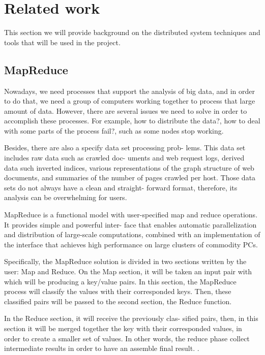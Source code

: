 
\label{sec:relatedWork}
\section{Related work}
This section we will provide background on the distributed system techniques and tools that will be used in the project.

\subsection{MapReduce}

Nowadays, we need processes that support the analysis of big data, and in order to do that, we need a group of computers working together to process that large amount of data. However, there are several issues we need to solve in order to accomplish these processes. For example, how to distribute the data?, how to deal with some parts of the process fail?, such as some nodes stop working.

Besides, there are also a specify data set processing prob- lems. This data set includes raw data such as crawled doc- uments and web request logs, derived data such inverted indices, various representations of the graph structure of web documents, and summaries of the number of pages crawled per host. Those data sets do not always have a clean and straight- forward format, therefore, its analysis can be overwhelming for users.

MapReduce is a functional model with user-specified map and reduce operations. It provides simple and powerful inter- face that enables automatic parallelization and distribution of large-scale computations, combined with an implementation of the interface that achieves high performance on large clusters of commodity PCs.

Specifically, the MapReduce solution is divided in two sections written by the user: Map and Reduce. On the Map section, it will be taken an input pair with which will be producing a key/value pairs. In this section, the MapReduce process will classify the values with their corresponded keys. Then, these classified pairs will be passed to the second section, the Reduce function.

In the Reduce section, it will receive the previously clas- sified pairs, then, in this section it will be merged together the key with their corresponded values, in order to create a smaller set of values. In other words, the reduce phase collect intermediate results in order to have an assemble final result. \cite{dean2008mapreduce}.

